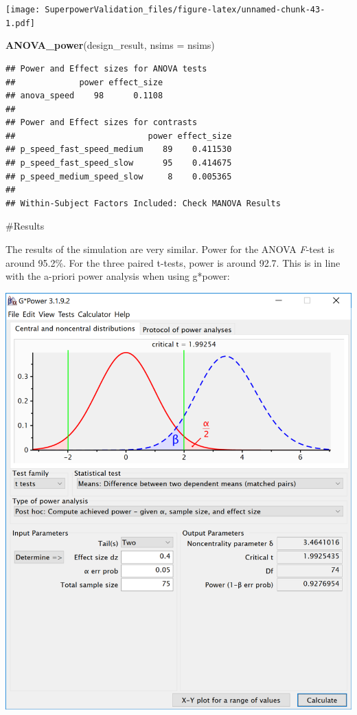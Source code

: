 \documentclass[]{book}
\newenvironment{Shaded}{\begin{snugshade}}{\end{snugshade}}
\newcommand{\DataTypeTok}[1]{\textcolor[rgb]{0.13,0.29,0.53}{#1}}
\newcommand{\KeywordTok}[1]{\textcolor[rgb]{0.13,0.29,0.53}{\textbf{#1}}}
\newcommand{\NormalTok}[1]{#1}
\begin{document}
\texttt{[image: SuperpowerValidation\_files/figure-latex/unnamed-chunk-43-1.pdf]}

\begin{Shaded}
\begin{Highlighting}[]
\KeywordTok{ANOVA_power}\NormalTok{(design_result, }\DataTypeTok{nsims =}\NormalTok{ nsims)}
\end{Highlighting}
\end{Shaded}

\begin{verbatim}
## Power and Effect sizes for ANOVA tests
##             power effect_size
## anova_speed    98      0.1108
## 
## Power and Effect sizes for contrasts
##                           power effect_size
## p_speed_fast_speed_medium    89    0.411530
## p_speed_fast_speed_slow      95    0.414675
## p_speed_medium_speed_slow     8    0.005365
## 
## Within-Subject Factors Included: Check MANOVA Results
\end{verbatim}

\#Results

The results of the simulation are very similar. Power for the ANOVA \emph{F}-test is around 95.2\%. For the three paired t-tests, power is around 92.7. This is in line with the a-priori power analysis when using g*power:

\includegraphics{screenshots/gpower_2.png}
\end{document}
